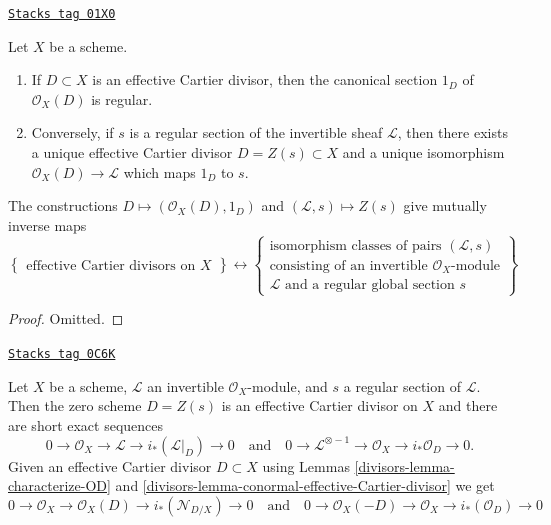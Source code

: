 \begin{lemma}
\label{divisors-lemma-characterize-OD}
\href{https://stacks.math.columbia.edu/tag/01X0}{\texttt{Stacks tag 01X0}}


Let $X$ be a scheme.
\begin{enumerate}
\item If $D \subset X$ is an effective Cartier divisor, then
the canonical section $1_D$ of $\mathcal{O}_X(D)$ is regular.
\item Conversely, if $s$ is a regular section of the invertible
sheaf $\mathcal{L}$, then there exists a unique effective
Cartier divisor $D = Z(s) \subset X$ and a unique isomorphism
$\mathcal{O}_X(D) \to \mathcal{L}$ which maps $1_D$ to $s$.
\end{enumerate}
The constructions
$D \mapsto (\mathcal{O}_X(D), 1_D)$ and $(\mathcal{L}, s) \mapsto Z(s)$
give mutually inverse maps
$$
\left\{
\begin{matrix}
\text{effective Cartier divisors on }X
\end{matrix}
\right\}
\leftrightarrow
\left\{
\begin{matrix}
\text{isomorphism classes of pairs }(\mathcal{L}, s)\\
\text{consisting of an invertible }
\mathcal{O}_X\text{-module}\\
\mathcal{L}\text{ and a regular global section }s
\end{matrix}
\right\}
$$
\end{lemma}

\begin{proof}
Omitted.
\end{proof}

\begin{remark}
\label{divisors-remark-ses-regular-section}
\href{https://stacks.math.columbia.edu/tag/0C6K}{\texttt{Stacks tag 0C6K}}

Let $X$ be a scheme, $\mathcal{L}$ an invertible $\mathcal{O}_X$-module,
and $s$ a regular section of $\mathcal{L}$. Then the zero scheme
$D = Z(s)$ is an effective Cartier divisor on $X$ and there are
short exact sequences
$$
0 \to \mathcal{O}_X \to \mathcal{L} \to i_*(\mathcal{L}|_D) \to 0
\quad\text{and}\quad
0 \to \mathcal{L}^{\otimes -1} \to \mathcal{O}_X \to i_*\mathcal{O}_D \to 0.
$$
Given an effective Cartier divisor $D \subset X$ using
Lemmas \ref{divisors-lemma-characterize-OD} and
\ref{divisors-lemma-conormal-effective-Cartier-divisor}
we get
$$
0 \to \mathcal{O}_X \to \mathcal{O}_X(D) \to i_*(\mathcal{N}_{D/X}) \to 0
\quad\text{and}\quad
0 \to \mathcal{O}_X(-D) \to \mathcal{O}_X \to i_*(\mathcal{O}_D) \to 0
$$
\end{remark}

